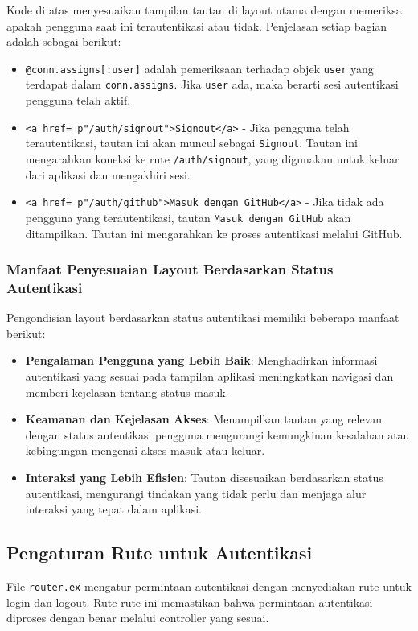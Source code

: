 Kode di atas menyesuaikan tampilan tautan di layout utama dengan memeriksa apakah pengguna saat ini terautentikasi atau tidak. Penjelasan setiap bagian adalah sebagai berikut:

\begin{itemize}
	\item \texttt{@conn.assigns[:user]} adalah pemeriksaan terhadap objek \texttt{user} yang terdapat dalam \texttt{conn.assigns}. Jika \texttt{user} ada, maka berarti sesi autentikasi pengguna telah aktif.
	\item \texttt{<a href={~p"/auth/signout"}>Signout</a>} - Jika pengguna telah terautentikasi, tautan ini akan muncul sebagai \texttt{Signout}. Tautan ini mengarahkan koneksi ke rute \texttt{/auth/signout}, yang digunakan untuk keluar dari aplikasi dan mengakhiri sesi.
	\item \texttt{<a href={~p"/auth/github"}>Masuk dengan GitHub</a>} - Jika tidak ada pengguna yang terautentikasi, tautan \texttt{Masuk dengan GitHub} akan ditampilkan. Tautan ini mengarahkan ke proses autentikasi melalui GitHub.
\end{itemize}

\subsubsection{Manfaat Penyesuaian Layout Berdasarkan Status Autentikasi}
Pengondisian layout berdasarkan status autentikasi memiliki beberapa manfaat berikut:
\begin{itemize}
	\item \textbf{Pengalaman Pengguna yang Lebih Baik}: Menghadirkan informasi autentikasi yang sesuai pada tampilan aplikasi meningkatkan navigasi dan memberi kejelasan tentang status masuk.
	\item \textbf{Keamanan dan Kejelasan Akses}: Menampilkan tautan yang relevan dengan status autentikasi pengguna mengurangi kemungkinan kesalahan atau kebingungan mengenai akses masuk atau keluar.
	\item \textbf{Interaksi yang Lebih Efisien}: Tautan disesuaikan berdasarkan status autentikasi, mengurangi tindakan yang tidak perlu dan menjaga alur interaksi yang tepat dalam aplikasi.
\end{itemize}


\subsection{Pengaturan Rute untuk Autentikasi}
File \texttt{router.ex} mengatur permintaan autentikasi dengan menyediakan rute untuk login dan logout. Rute-rute ini memastikan bahwa permintaan autentikasi diproses dengan benar melalui controller yang sesuai.

